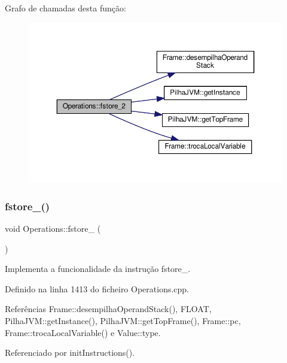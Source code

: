 Grafo de chamadas desta função\+:
\nopagebreak
\begin{figure}[H]
\begin{center}
\leavevmode
\includegraphics[width=350pt]{classOperations_a6d0a2faa9f164d49accf491a95364e2f_cgraph}
\end{center}
\end{figure}
\mbox{\label{classOperations_a00786621697e0e6e6c084c3cee1599ae}} 
\subsubsection{\texorpdfstring{fstore\+\_()}{fstore\_3()}}
{\footnotesize\ttfamily void Operations\+::fstore\+\_ (\begin{DoxyParamCaption}{ }\end{DoxyParamCaption})\hspace{0.3cm}{\ttfamily [private]}}



Implementa a funcionalidade da instrução fstore\+\_. 



Definido na linha 1413 do ficheiro Operations.\+cpp.



Referências Frame\+::desempilha\+Operand\+Stack(), F\+L\+O\+AT, Pilha\+J\+V\+M\+::get\+Instance(), Pilha\+J\+V\+M\+::get\+Top\+Frame(), Frame\+::pc, Frame\+::troca\+Local\+Variable() e Value\+::type.



Referenciado por init\+Instructions().

